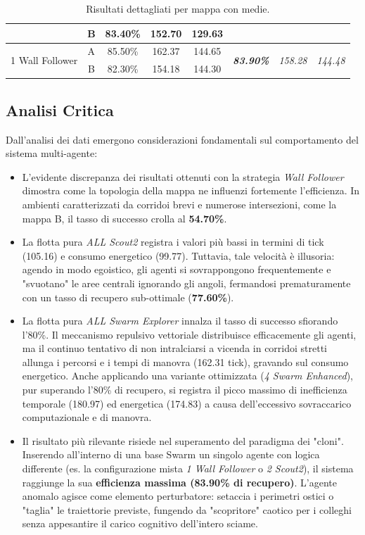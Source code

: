 \documentclass[11pt,a4paper]{article}
\begin{document}
\begin{table}[H]
{\begin{tabular}{|l|c|c|c|c|c|c|c|}
                                   & B & 83.40\% & 152.70 & 129.63 & & & \\ \hline
\multirow{2}{*}{1 Wall Follower}   & A & 85.50\% & 162.37 & 144.65 & \multirow{2}{*}{\textbf{\textit{83.90\%}}} & \multirow{2}{*}{\textit{158.28}} & \multirow{2}{*}{\textit{144.48}} \\ \cline{2-5}
                                   & B & 82.30\% & 154.18 & 144.30 & & & \\ \hline
\end{tabular}
}
\caption{Risultati dettagliati per mappa con medie.}
\label{tab:results_map_avg}
\end{table}

\subsection{Analisi Critica}
Dall'analisi dei dati emergono considerazioni fondamentali sul comportamento del sistema multi-agente:

\begin{itemize}
    \item L'evidente discrepanza dei risultati ottenuti con la strategia \textit{Wall Follower} dimostra come la topologia della mappa ne influenzi fortemente l'efficienza. In ambienti caratterizzati da corridoi brevi e numerose intersezioni, come la mappa B, il tasso di successo crolla al \textbf{54.70\%}.
    \item La flotta pura \textit{ALL Scout2} registra i valori più bassi in termini di tick (105.16) e consumo energetico (99.77). Tuttavia, tale velocità è illusoria: agendo in modo egoistico, gli agenti si sovrappongono frequentemente e "svuotano" le aree centrali ignorando gli angoli, fermandosi prematuramente con un tasso di recupero sub-ottimale (\textbf{77.60\%}).
    \item La flotta pura \textit{ALL Swarm Explorer} innalza il tasso di successo sfiorando l'80\%. Il meccanismo repulsivo vettoriale distribuisce efficacemente gli agenti, ma il continuo tentativo di non intralciarsi a vicenda in corridoi stretti allunga i percorsi e i tempi di manovra (162.31 tick), gravando sul consumo energetico. Anche applicando una variante ottimizzata (\textit{4 Swarm Enhanced}), pur superando l'80\% di recupero, si registra il picco massimo di inefficienza temporale (180.97) ed energetica (174.83) a causa dell'eccessivo sovraccarico computazionale e di manovra.
    \item Il risultato più rilevante risiede nel superamento del paradigma dei "cloni". Inserendo all'interno di una base Swarm un singolo agente con logica differente (es. la configurazione mista \textit{1 Wall Follower} o \textit{2 Scout2}), il sistema raggiunge la sua \textbf{efficienza massima (83.90\% di recupero)}. L'agente anomalo agisce come elemento perturbatore: setaccia i perimetri ostici o "taglia" le traiettorie previste, fungendo da "scopritore" caotico per i colleghi senza appesantire il carico cognitivo dell'intero sciame.

\end{itemize}
\end{document}
